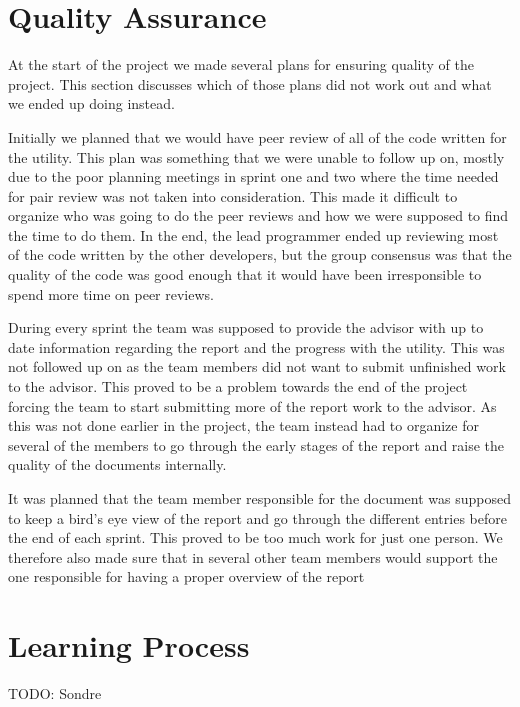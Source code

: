 \section{Quality Assurance}
At the start of the project we made several plans for ensuring quality of the project. This section discusses which of those plans did not work out and what we ended up doing instead.

Initially we planned that we would have peer review of all of the code written for the utility. This plan was something that we were unable to follow up on, mostly due to the poor planning meetings in sprint one and two where the time needed for pair review was not taken into consideration. This made it difficult to organize who was going to do the peer reviews and how we were supposed to find the time to do them. In the end, the lead programmer ended up reviewing most of the code written by the other developers, but the group consensus was that the quality of the code was good enough that it would have been irresponsible to spend more time on peer reviews.

During every sprint the team was supposed to provide the advisor with up to date information regarding the report and the progress with the utility. This was not followed up on as the team members did not want to submit unfinished work to the advisor. This proved to be a problem towards the end of the project forcing the team to start submitting more of the report work to the advisor. As this was not done earlier in the project, the team instead had to organize for several of the members to go through the early stages of the report and raise the quality of the documents internally.

It was planned that the team member responsible for the document was supposed to keep a bird's eye view of the report and go through the different entries before the end of each sprint. This proved to be too much work for just one person. We therefore also made sure that in several other team members would support the one responsible for having a proper overview of the report 

\section{Learning Process}
TODO: Sondre

